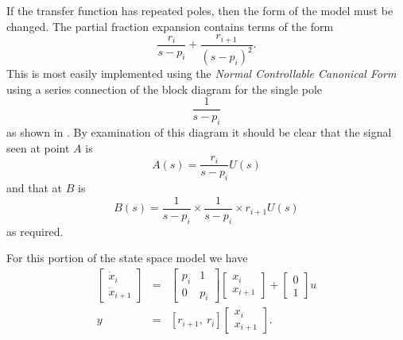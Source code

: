 If the transfer function has repeated poles, then the form of the
model must be changed. The partial fraction expansion contains
terms of the form \[\frac{r_i}{s-p_i} +
\frac{r_{i+1}}{(s-p_i)^2}.\] This is most easily implemented using
the \emph{Normal Controllable Canonical Form} using a series
connection of the block diagram for the single pole
\[\frac{1}{s-p_i}\] as shown in . By examination
of this diagram it should be clear that the signal seen at point
$A$ is \[A(s) = \frac{r_i}{s-p_i}U(s)\] and that at $B$ is
\[B(s) = \frac{1}{s-p_i}\times\frac{1}{s-p_i}\times r_{i+1} U(s)\] as required.
\begin{slide}\label{slide:l6s4}
\end{slide}
For this portion of the state space model we have
\begin{eqnarray*}
\left[\begin{array}{c}
  \dot{x}_i \\
  \dot{x}_{i+1}
\end{array}\right] &=& \left[\begin{array}{cc}
  p_i & 1 \\
  0 & p_i
\end{array}\right]\left[\begin{array}{c}
  x_i \\
  x_{i+1}
\end{array}\right] + \left[\begin{array}{c}
  0 \\
  1
\end{array}\right] u\\
y & = & \left[r_{i+1},\ r_i\right]\left[\begin{array}{c}
  x_i \\
  x_{i+1}
\end{array}\right].
\end{eqnarray*}

